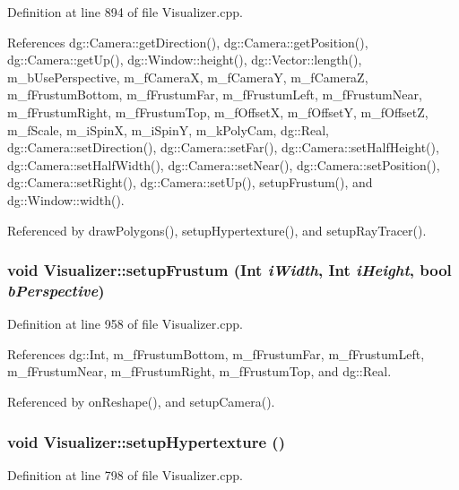 Definition at line 894 of file Visualizer.cpp.

References dg::Camera::get\-Direction(), dg::Camera::get\-Position(), dg::Camera::get\-Up(), dg::Window::height(), dg::Vector::length(), m\_\-b\-Use\-Perspective, m\_\-f\-Camera\-X, m\_\-f\-Camera\-Y, m\_\-f\-Camera\-Z, m\_\-f\-Frustum\-Bottom, m\_\-f\-Frustum\-Far, m\_\-f\-Frustum\-Left, m\_\-f\-Frustum\-Near, m\_\-f\-Frustum\-Right, m\_\-f\-Frustum\-Top, m\_\-f\-Offset\-X, m\_\-f\-Offset\-Y, m\_\-f\-Offset\-Z, m\_\-f\-Scale, m\_\-i\-Spin\-X, m\_\-i\-Spin\-Y, m\_\-k\-Poly\-Cam, dg::Real, dg::Camera::set\-Direction(), dg::Camera::set\-Far(), dg::Camera::set\-Half\-Height(), dg::Camera::set\-Half\-Width(), dg::Camera::set\-Near(), dg::Camera::set\-Position(), dg::Camera::set\-Right(), dg::Camera::set\-Up(), setup\-Frustum(), and dg::Window::width().

Referenced by draw\-Polygons(), setup\-Hypertexture(), and setup\-Ray\-Tracer().
\subsubsection{\setlength{\rightskip}{0pt plus 5cm}void Visualizer::setup\-Frustum ({\bf Int} {\em i\-Width}, {\bf Int} {\em i\-Height}, bool {\em b\-Perspective})\hspace{0.3cm}{\tt  [protected]}}\label{classdg_1_1Visualizer_b4}




Definition at line 958 of file Visualizer.cpp.

References dg::Int, m\_\-f\-Frustum\-Bottom, m\_\-f\-Frustum\-Far, m\_\-f\-Frustum\-Left, m\_\-f\-Frustum\-Near, m\_\-f\-Frustum\-Right, m\_\-f\-Frustum\-Top, and dg::Real.

Referenced by on\-Reshape(), and setup\-Camera().
\subsubsection{\setlength{\rightskip}{0pt plus 5cm}void Visualizer::setup\-Hypertexture ()\hspace{0.3cm}{\tt  [protected]}}\label{classdg_1_1Visualizer_b2}




Definition at line 798 of file Visualizer.cpp.

